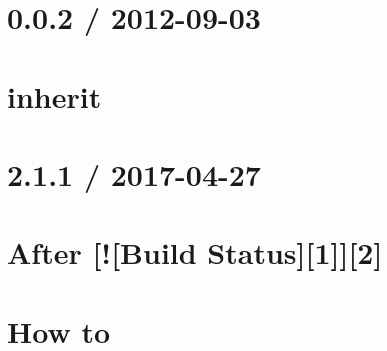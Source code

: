 \documentclass[twoside]{book}
\newcommand{\+}{\discretionary{\mbox{\scriptsize$\hookleftarrow$}}{}{}}
\begin{document}
\chapter{0.0.2 / 2012-\/09-\/03}
\label{md_bin_node_modules_socket_8io_node_modules_socket_8io-client_node_modules_engine_8io-client_nodbe4f8e9c6a6d5327f704d535b6d2c5ce}

\chapter{inherit}
\label{md_bin_node_modules_socket_8io_node_modules_socket_8io-client_node_modules_engine_8io-client_nodf228bfb544a65d70224465766f30416d}

\chapter{2.1.1 / 2017-\/04-\/27}
\label{md_bin_node_modules_socket_8io_node_modules_socket_8io-client_node_modules_engine_8io-client_nodd21e0a4dc0575b1e8fb9f76fc9a1a6a3}

\chapter{After \mbox{[}!\mbox{[}Build Status\mbox{]}\mbox{[}1\mbox{]}\mbox{]}\mbox{[}2\mbox{]}}
\label{md_bin_node_modules_socket_8io_node_modules_socket_8io-client_node_modules_engine_8io-client_nodb09ece4b0c14f0de55ea3aa45ae81655}

\chapter{How to}
\label{md_bin_node_modules_socket_8io_node_modules_socket_8io-client_node_modules_engine_8io-client_nodbb23d38826368325a9a27c9b08206278}

\end{document}
